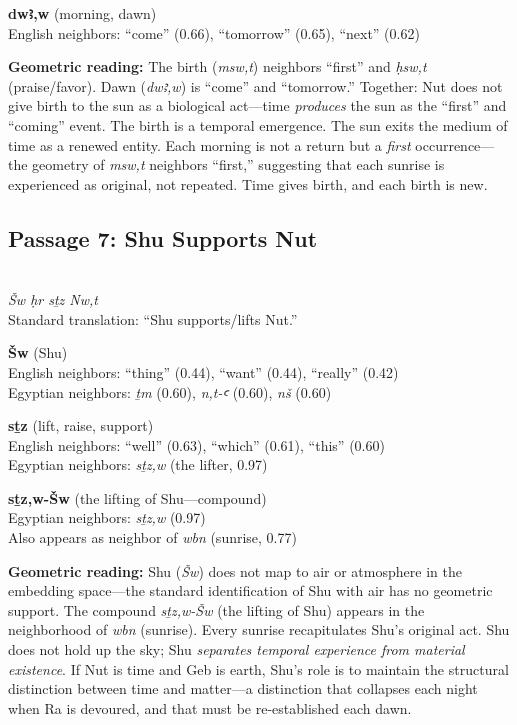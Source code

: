 \documentclass[11pt, a4paper]{article}
\newcommand{\passagehiero}[1]{{\normalfont\hierofont\fontsize{14}{17}\selectfont #1}}
\begin{document}
\medskip

\noindent\textbf{dwꜣ,w} (morning, dawn)\\
English neighbors: ``come'' (0.66), ``tomorrow'' (0.65), ``next'' (0.62)

\medskip

{\color{insight}\textbf{Geometric reading:}} The birth (\textit{msw,t}) neighbors ``first'' and \textit{ḥsw,t} (praise/favor). Dawn (\textit{dwꜣ,w}) is ``come'' and ``tomorrow.'' Together: Nut does not give birth to the sun as a biological act---time \textit{produces} the sun as the ``first'' and ``coming'' event. The birth is a temporal emergence. The sun exits the medium of time as a renewed entity. Each morning is not a return but a \textit{first} occurrence---the geometry of \textit{msw,t} neighbors ``first,'' suggesting that each sunrise is experienced as original, not repeated. Time gives birth, and each birth is new.

\subsection{Passage 7: Shu Supports Nut}

{\color{passage}\passagehiero{𓆄𓅱 𓁷𓏤 𓋴𓏏𓊃 𓈖𓅱𓏏𓇼}\\\medskip
\textit{\small Šw ḥr sṯz Nw,t}\\
Standard translation: ``Shu supports/lifts Nut.''}

\bigskip

\noindent\textbf{Šw} (Shu)\\
English neighbors: ``thing'' (0.44), ``want'' (0.44), ``really'' (0.42)\\
Egyptian neighbors: \textit{ṯm} (0.60), \textit{n,t-ꜥ} (0.60), \textit{nš} (0.60)

\medskip

\noindent\textbf{sṯz} (lift, raise, support)\\
English neighbors: ``well'' (0.63), ``which'' (0.61), ``this'' (0.60)\\
Egyptian neighbors: \textit{sṯz,w} (the lifter, 0.97)

\medskip

\noindent\textbf{sṯz,w-Šw} (the lifting of Shu---compound)\\
Egyptian neighbors: \textit{sṯz,w} (0.97)\\
Also appears as neighbor of \textit{wbn} (sunrise, 0.77)

\medskip

{\color{insight}\textbf{Geometric reading:}} Shu (\textit{Šw}) does not map to air or atmosphere in the embedding space---the standard identification of Shu with air has no geometric support. The compound \textit{sṯz,w-Šw} (the lifting of Shu) appears in the neighborhood of \textit{wbn} (sunrise). Every sunrise recapitulates Shu's original act. Shu does not hold up the sky; Shu \textit{separates temporal experience from material existence}. If Nut is time and Geb is earth, Shu's role is to maintain the structural distinction between time and matter---a distinction that collapses each night when Ra is devoured, and that must be re-established each dawn.
\end{document}
